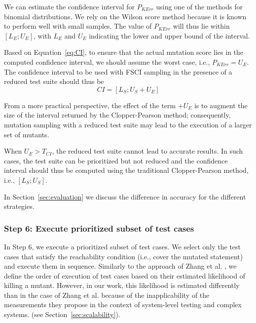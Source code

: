  {We can estimate the confidence interval for $P_{\mathit{KErr}}$ using one of the methods for binomial distributions.
We rely on the Wilson score method because it is known to perform well with small samples. 
The value of $P_{\mathit{KErr}}$ will thus lie within $[\mathit{L}_{E};\mathit{U}_{E}]$,  with $\mathit{L}_{E}$ and $\mathit{U}_{E}$ indicating the lower and upper bound of the interval.}

 {Based on Equation~\ref{eq:CI}, to ensure that the actual mutation score lies in the computed confidence interval, we should assume the worst case, i.e., $P_{\mathit{KErr}}=\mathit{U}_{E}$.
The confidence interval to be used with FSCI sampling in the presence of a reduced test suite should thus be }
\begin{equation}
\label{eq:CI:FSCI}
\mathit{CI}=[\mathit{L}_{S};\mathit{U}_{S}+\mathit{U}_{E}]
\end{equation}

 {From a more practical perspective, the effect of the term $+\mathit{U}_{E}$ is to augment the size of the interval returned by the Clopper-Pearson method; consequently, mutation sampling with a reduced test suite may lead to the execution of a larger set of mutants.}

 {When $\mathit{U}_{E}>T_{\mathit{CI}}$, the reduced test suite cannot lead to accurate results. In such cases, the test suite can be prioritized but not reduced and the confidence interval should thus be computed using the traditional Clopper-Pearson method, i.e., $[\mathit{L}_{S};\mathit{U}_{S}]$.}

 {In Section~\ref{sec:evaluation} we discuss the difference in accuracy for the different strategies.}

\ENDCHANGEDNOV

\subsubsection{Step 6: Execute prioritized subset of test cases}
\label{sec:step:prioritize}

In Step 6, we execute a prioritized subset of test cases. 
We select only the test cases that satisfy 
the reachability condition (i.e., cover the mutated statement) and  execute them in sequence.
Similarly to the approach of Zhang et al. \cite{zhang2013faster}, we define the order of execution of test cases based on their estimated likelihood of killing a mutant.
 {However, in our work, this likelihood is estimated differently than in the case of Zhang et al. because of the inapplicability of the measurements they propose in the context of system-level testing and complex systems. 
(see Section~\ref{sec:scalability}).}


